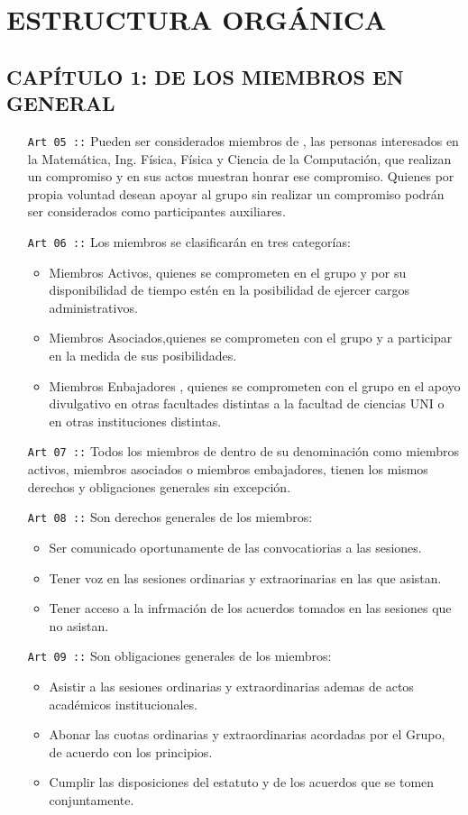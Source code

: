 \chapter {ESTRUCTURA ORGÁNICA}
\section*{CAPÍTULO 1: DE LOS MIEMBROS EN GENERAL}
\begin{itemize}
  \item [\texttt{Art 05 ::}] Pueden ser considerados miembros de \flae, las personas interesados en la Matemática, Ing. Física, Física y Ciencia de la Computación,  que realizan un compromiso y en sus actos muestran honrar ese compromiso. Quienes por propia voluntad desean apoyar al grupo sin
  realizar un compromiso podrán ser considerados como participantes auxiliares.
  \item [\texttt{Art 06 ::}] Los miembros se clasificarán  en tres categorías:
    \begin{itemize}
      \item Miembros Activos, quienes se comprometen en el grupo y por su disponibilidad de tiempo estén en la posibilidad de ejercer cargos administrativos.
      \item Miembros Asociados,quienes se comprometen con el grupo y a participar en la medida de sus posibilidades.
      \item Miembros Enbajadores , quienes se comprometen con el grupo en el apoyo divulgativo en otras facultades distintas a la facultad de ciencias UNI o en otras instituciones distintas.
    \end{itemize}
  \item [\texttt{Art 07 ::}] Todos los miembros de \flae dentro de su denominación como miembros activos, miembros asociados o miembros embajadores, tienen los mismos derechos y obligaciones generales sin excepción.
  \item [\texttt{Art 08 ::}] Son derechos generales de los miembros:
  \begin{itemize}
    \item Ser comunicado oportunamente de las convocatiorias a las sesiones.
    \item Tener voz en las sesiones ordinarias y extraorinarias en las que asistan.
    \item Tener acceso  a la infrmación de los acuerdos tomados en las sesiones que no asistan.
  \end{itemize}
  \item [\texttt{Art 09 ::}] Son obligaciones generales de los miembros:
  \begin{itemize}
    \item Asistir a las sesiones ordinarias y extraordinarias ademas de actos académicos institucionales.
    \item Abonar las cuotas ordinarias y extraordinarias acordadas por el Grupo, de acuerdo con los principios.
    \item Cumplir las disposiciones del estatuto y de los acuerdos que se tomen conjuntamente.
  \end{itemize}
\end{itemize}


